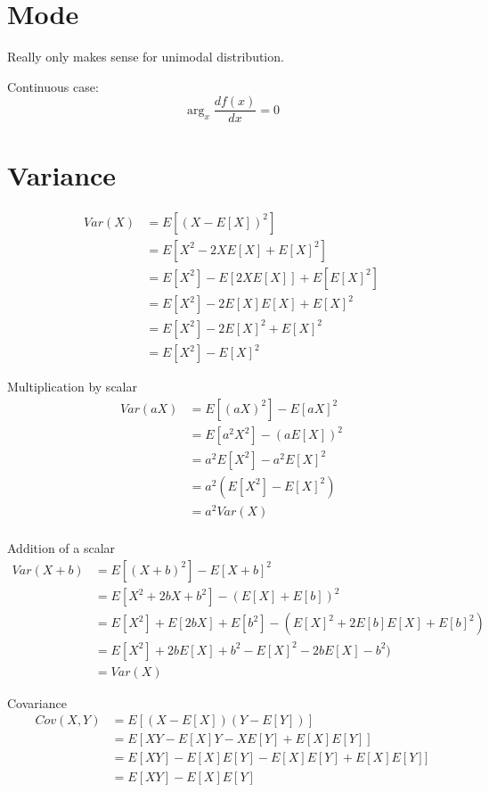 \documentclass{article}
\begin{document}
\section{Mode}

Really only makes sense for unimodal distribution.

Continuous case:
\begin{equation*}
  \arg_x \frac{df(x)}{dx} = 0
\end{equation*}

\section{Variance}
\begin{align*}
  Var(X) &= E[(X-E[X])^2] \\
  &= E[X^2-2XE[X]+E[X]^2]\\
  &= E[X^2] - E[2XE[X]] + E[E[X]^2]\\
  &= E[X^2] - 2E[X]E[X] + E[X]^2\\
  &= E[X^2] - 2E[X]^2 + E[X]^2\\
  &= E[X^2] - E[X]^2
\end{align*}

Multiplication by scalar
\begin{align*}
Var(aX) &= E[(aX)^2] - E[aX]^2\\
&= E[a^2X^2] - (aE[X])^2\\
&= a^2E[X^2] - a^2E[X]^2\\
&= a^2(E[X^2] - E[X]^2)\\
&= a^2Var(X)\\
\end{align*}

Addition of a scalar
\begin{align*}
Var(X+b) &= E[(X+b)^2] - E[X+b]^2\\
&= E[X^2+2bX+b^2] - (E[X]+E[b])^2\\
&= E[X^2]+E[2bX]+E[b^2] - (E[X]^2+2E[b]E[X]+E[b]^2)\\
&= E[X^2]+2bE[X]+b^2 - E[X]^2-2bE[X]-b^2)\\
&= Var(X)
\end{align*}

Covariance
\begin{align*}
  Cov(X,Y)&=E[(X-E[X])(Y-E[Y])]\\
  &=E[XY-E[X]Y-XE[Y]+E[X]E[Y]]\\
  &=E[XY]-E[X]E[Y]-E[X]E[Y]+E[X]E[Y]]\\
  &=E[XY]-E[X]E[Y]\\
\end{align*}
\end{document}
